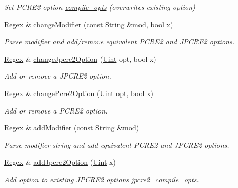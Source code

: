 \begin{DoxyCompactItemize}
\begin{DoxyCompactList}\small\item\em Set P\+C\+R\+E2 option \hyperlink{classjpcre2_1_1Regex_a5954131e9085de63229ed5c11417df69}{compile\+\_\+opts} (overwrites existing option) \end{DoxyCompactList}\item 
\hyperlink{classjpcre2_1_1Regex}{Regex} \& \hyperlink{classjpcre2_1_1Regex_abc4a13f1baa8f23a8747fb0ffd46a836}{change\+Modifier} (const \hyperlink{namespacejpcre2_a91f03070152fb228bc116c5a737f1d16}{String} \&mod, bool x)
\begin{DoxyCompactList}\small\item\em Parse modifier and add/remove equivalent P\+C\+R\+E2 and J\+P\+C\+R\+E2 options. \end{DoxyCompactList}\item 
\hyperlink{classjpcre2_1_1Regex}{Regex} \& \hyperlink{classjpcre2_1_1Regex_ab8e0b1a49eeb1077ba54cf3b5292c95e}{change\+Jpcre2\+Option} (\hyperlink{namespacejpcre2_a078242d38221a13fb3543b9edd78c099}{Uint} opt, bool x)
\begin{DoxyCompactList}\small\item\em Add or remove a J\+P\+C\+R\+E2 option. \end{DoxyCompactList}\item 
\hyperlink{classjpcre2_1_1Regex}{Regex} \& \hyperlink{classjpcre2_1_1Regex_ae5bde8008cc5a700163ca3162dbd5823}{change\+Pcre2\+Option} (\hyperlink{namespacejpcre2_a078242d38221a13fb3543b9edd78c099}{Uint} opt, bool x)
\begin{DoxyCompactList}\small\item\em Add or remove a P\+C\+R\+E2 option. \end{DoxyCompactList}\item 
\hyperlink{classjpcre2_1_1Regex}{Regex} \& \hyperlink{classjpcre2_1_1Regex_ab1af1471339602446d8221b8c97c6b55}{add\+Modifier} (const \hyperlink{namespacejpcre2_a91f03070152fb228bc116c5a737f1d16}{String} \&mod)
\begin{DoxyCompactList}\small\item\em Parse modifier string and add equivalent P\+C\+R\+E2 and J\+P\+C\+R\+E2 options. \end{DoxyCompactList}\item 
\hyperlink{classjpcre2_1_1Regex}{Regex} \& \hyperlink{classjpcre2_1_1Regex_a03974fa7ba8f7c47186cb8d6f54934de}{add\+Jpcre2\+Option} (\hyperlink{namespacejpcre2_a078242d38221a13fb3543b9edd78c099}{Uint} x)
\begin{DoxyCompactList}\small\item\em Add option to existing J\+P\+C\+R\+E2 options \hyperlink{classjpcre2_1_1Regex_abdd26c3bc1c3132f0aa73dde1690a7ef}{jpcre2\+\_\+compile\+\_\+opts}. \end{DoxyCompactList}\item 

\end{DoxyCompactItemize}
